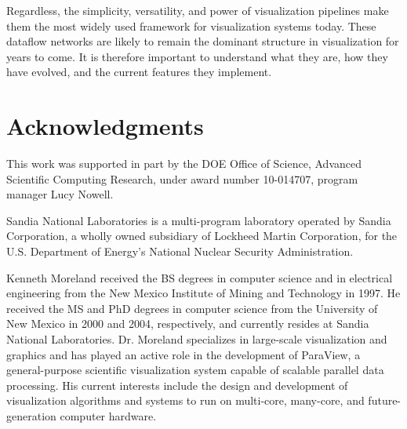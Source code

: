 \documentclass[journal,twocolumn,10pt,letterpaper,twoside]{IEEEtran}
\begin{document}
Regardless, the simplicity, versatility, and power of visualization pipelines make them
the most widely used framework for visualization systems today.  These
dataflow networks are likely to remain the dominant structure in
visualization for years to come.  It is therefore important to understand
what they are, how they have evolved, and the current features they
implement.


\section*{Acknowledgments}

This work was supported in part by the DOE Office of Science, Advanced
Scientific Computing Research, under award number 10-014707, program
manager Lucy Nowell.

Sandia National Laboratories is a multi-program laboratory operated by
Sandia Corporation, a wholly owned subsidiary of Lockheed Martin
Corporation, for the U.S. Department of Energy's National Nuclear Security
Administration.




\begin{IEEEbiography}{Kenneth Moreland}
  received the BS degrees in computer science and in electrical engineering
  from the New Mexico Institute of Mining and Technology in 1997.  He
  received the MS and PhD degrees in computer science from the University
  of New Mexico in 2000 and 2004, respectively, and currently resides at
  Sandia National Laboratories.  Dr. Moreland specializes in large-scale
  visualization and graphics and has played an active role in the
  development of ParaView, a general-purpose scientific visualization
  system capable of scalable parallel data processing.  His current
  interests include the design and development of visualization algorithms
  and systems to run on multi-core, many-core, and future-generation
  computer hardware.
\end{IEEEbiography}
\end{document}
